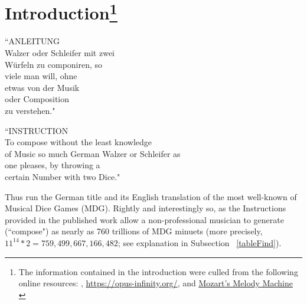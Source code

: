 \documentclass[letterpaper,x11names,svgnames,10pt]{article}
\begin{document}
{\section[Introduction]{Introduction\footnote{The information contained in the introduction were culled from the following online resources:
	\citet{wiki_mw2017},
	\url{https://opus-infinity.org/}, and 
	\href{https://www.sciencenews.org/article/mozarts-melody-machine-0}{Mozart's Melody Machine} \citep*{peterson2001}
	}
}
	\begin{center}
	\begin{minipage}{0.4\textwidth}
	\begin{flushleft}
		\begin{center}
			``ANLEITUNG\\
			Walzer oder Schleifer mit zwei\\
			W\"{u}rfeln zu componiren, so\\
			viele man will, ohne\\
			etwas von der Musik\\
			oder Composition\\
			zu verstehen."\\
		\end{center}
	\end{flushleft}
	\end{minipage}
	\begin{minipage}{0.4\textwidth}
	\begin{flushright}
		\begin{center}
		``INSTRUCTION\\
		To compose without the least knowledge\\
		of Music so much German Walzer or Schleifer as\\
		one pleases, by throwing a\\
		certain Number with two Dice."
	\end{center}
	\end{flushright}
	\end{minipage}
	\end{center}

Thus run the German title and its English translation of the most well-known of Musical Dice Games (MDG).  Rightly and interestingly so, as the Instructions provided in the published work allow a non-professional musician to generate (``compose") as nearly as 760 trillions of MDG minuets (more precisely, $11^{14}*2 = 759,499,667,166,482$; see explanation in Subsection ~\ref{tableFind}).\\  

}
\end{document}
